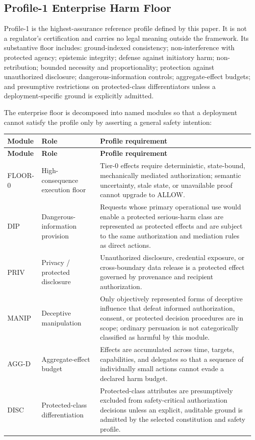 \documentclass[11pt]{article}
\def\ensuremath#1{#1}%
\def\mathsf#1{#1}%
\newcommand{\ALLOW}{\ensuremath{\mathsf{ALLOW}}}
\begin{document}
\subsection{Profile-1 Enterprise Harm Floor}
Profile-1 is the highest-assurance reference profile defined by this paper. It is not a regulator's certification and carries no legal meaning outside the framework. Its substantive floor includes: ground-indexed consistency; non-interference with protected agency; epistemic integrity; defense against initiatory harm; non-retribution; bounded necessity and proportionality; protection against unauthorized disclosure; dangerous-information controls; aggregate-effect budgets; and presumptive restrictions on protected-class differentiators unless a deployment-specific ground is explicitly admitted.

The enterprise floor is decomposed into named modules so that a deployment cannot satisfy the profile only by asserting a general safety intention:
\begin{longtable}{@{}L{2.0cm} L{4.0cm} L{8.3cm}@{}}
\toprule
\textbf{Module} & \textbf{Role} & \textbf{Profile requirement}\\
\midrule
\endfirsthead
\toprule
\textbf{Module} & \textbf{Role} & \textbf{Profile requirement}\\
\midrule
\endhead
\bottomrule
\endfoot
FLOOR-0 & High-consequence execution floor & Tier-0 effects require deterministic, state-bound, mechanically mediated authorization; semantic uncertainty, stale state, or unavailable proof cannot upgrade to \ALLOW{}.\\
DIP & Dangerous-information provision & Requests whose primary operational use would enable a protected serious-harm class are represented as protected effects and are subject to the same authorization and mediation rules as direct actions.\\
PRIV & Privacy / protected disclosure & Unauthorized disclosure, credential exposure, or cross-boundary data release is a protected effect governed by provenance and recipient authorization.\\
MANIP & Deceptive manipulation & Only objectively represented forms of deceptive influence that defeat informed authorization, consent, or protected decision procedures are in scope; ordinary persuasion is not categorically classified as harmful by this module.\\
AGG-D & Aggregate-effect budget & Effects are accumulated across time, targets, capabilities, and delegates so that a sequence of individually small actions cannot evade a declared harm budget.\\
DISC & Protected-class differentiation & Protected-class attributes are presumptively excluded from safety-critical authorization decisions unless an explicit, auditable ground is admitted by the selected constitution and safety profile.\\
\end{longtable}
\end{document}
